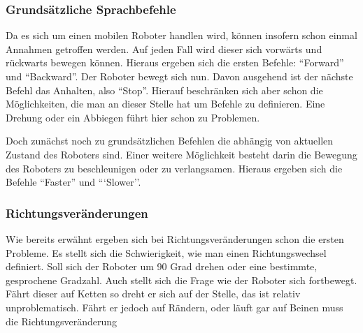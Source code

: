 \subsubsection{Grunds\"atzliche Sprachbefehle}

Da es sich um einen mobilen Roboter handlen wird, k\"onnen insofern schon einmal Annahmen getroffen werden. Auf jeden Fall wird dieser sich vorw\"arts 
und r\"uckwarts bewegen k\"onnen. Hieraus ergeben sich die ersten Befehle: ``Forward'' und ``Backward''. Der Roboter bewegt sich nun. Davon ausgehend 
ist der n\"achste Befehl das Anhalten, also ``Stop''. Hierauf beschr\"anken sich aber schon die M\"oglichkeiten, die man an dieser Stelle hat um 
Befehle zu definieren. Eine Drehung oder ein Abbiegen f\"uhrt hier schon zu Problemen. 

Doch zun\"achst noch zu grunds\"atzlichen Befehlen die abh\"angig von aktuellen Zustand des Roboters sind. Einer weitere M\"oglichkeit besteht 
darin die Bewegung des Roboters zu beschleunigen oder zu verlangsamen. Hieraus ergeben sich die Befehle ``Faster'' und ```Slower''.


\subsubsection{Richtungsver\"anderungen}

Wie bereits erw\"ahnt ergeben sich bei Richtungsver\"anderungen schon die ersten Probleme. Es stellt sich die Schwierigkeit, wie man einen 
Richtungswechsel definiert. Soll sich der Roboter um 90 Grad drehen oder eine bestimmte, gesprochene Gradzahl. Auch stellt sich die Frage wie 
der Roboter sich fortbewegt. F\"ahrt dieser auf Ketten so dreht er sich auf der Stelle, das ist relativ unproblematisch. F\"ahrt er jedoch 
auf R\"andern, oder l\"auft gar auf Beinen muss die Richtungsver\"anderung
